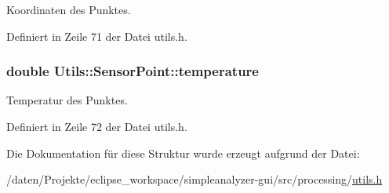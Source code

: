 Koordinaten des Punktes. 



Definiert in Zeile 71 der Datei utils.\-h.

\hypertarget{structUtils_1_1SensorPoint_a764d6572f865138b36cb46c910001e9a}{
\subsubsection[{temperature}]{\setlength{\rightskip}{0pt plus 5cm}double Utils\-::\-Sensor\-Point\-::temperature}}\label{structUtils_1_1SensorPoint_a764d6572f865138b36cb46c910001e9a}


Temperatur des Punktes. 



Definiert in Zeile 72 der Datei utils.\-h.



Die Dokumentation für diese Struktur wurde erzeugt aufgrund der Datei\-:\begin{DoxyCompactItemize}
\item 
/daten/\-Projekte/eclipse\-\_\-workspace/simpleanalyzer-\/gui/src/processing/\hyperlink{utils_8h}{utils.\-h}\end{DoxyCompactItemize}
